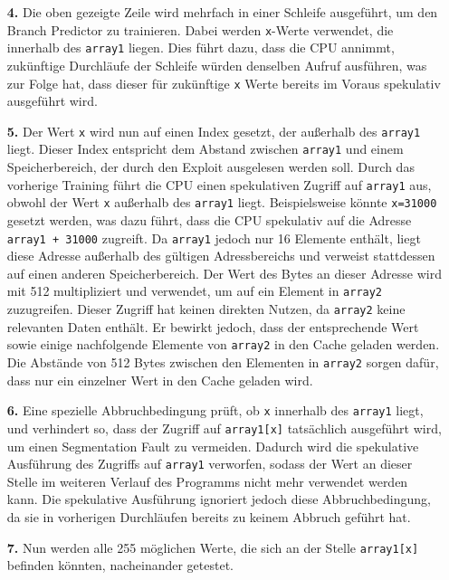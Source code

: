 \begin{itemize}
	\item[\textbf{4.}]\label{itm:spectre_step4} Die oben gezeigte Zeile wird mehrfach in einer Schleife ausgeführt, um den Branch Predictor zu trainieren.
	      Dabei werden \texttt{x}-Werte verwendet, die innerhalb des \texttt{array1} liegen.
	      Dies führt dazu, dass die CPU annimmt, zukünftige Durchläufe der Schleife würden denselben Aufruf ausführen,
	      was zur Folge hat, dass dieser für zukünftige \texttt{x} Werte bereits im Voraus spekulativ ausgeführt wird.
	\item[\textbf{5.}] Der Wert \texttt{x} wird nun auf einen Index gesetzt, der außerhalb des \texttt{array1} liegt.
	      Dieser Index entspricht dem Abstand zwischen \texttt{array1} und einem Speicherbereich, der durch den Exploit ausgelesen werden soll.
	      Durch das vorherige Training führt die CPU einen spekulativen Zugriff auf \texttt{array1} aus, obwohl der Wert \texttt{x} außerhalb des \texttt{array1} liegt.
	      Beispielsweise könnte \texttt{x=31000} gesetzt werden, was dazu führt, dass die CPU spekulativ auf die Adresse \texttt{array1 + 31000} zugreift.
	      Da \texttt{array1} jedoch nur 16 Elemente enthält, liegt diese Adresse außerhalb des gültigen Adressbereichs und verweist stattdessen auf einen anderen Speicherbereich.
	      Der Wert des Bytes an dieser Adresse wird mit 512 multipliziert und verwendet, um auf ein Element in \texttt{array2} zuzugreifen.
	      Dieser Zugriff hat keinen direkten Nutzen, da \texttt{array2} keine relevanten Daten enthält.
	      Er bewirkt jedoch, dass der entsprechende Wert sowie einige nachfolgende Elemente von \texttt{array2} in den Cache geladen werden.
	      Die Abstände von 512 Bytes zwischen den Elementen in \texttt{array2} sorgen dafür, dass nur ein einzelner Wert in den Cache geladen wird.
	\item[\textbf{6.}] Eine spezielle Abbruchbedingung prüft, ob \texttt{x} innerhalb des \texttt{array1} liegt, und verhindert so, dass der Zugriff auf \texttt{array1[x]} tatsächlich ausgeführt wird, um einen Segmentation Fault zu vermeiden.
	      Dadurch wird die spekulative Ausführung des Zugriffs auf \texttt{array1} verworfen, sodass der Wert an dieser Stelle im weiteren Verlauf des Programms nicht mehr verwendet werden kann.
	      Die spekulative Ausführung ignoriert jedoch diese Abbruchbedingung, da sie in vorherigen Durchläufen bereits zu keinem Abbruch geführt hat.
	\item[\textbf{7.}] Nun werden alle 255 möglichen Werte, die sich an der Stelle \texttt{array1[x]} befinden könnten, nacheinander getestet.

\end{itemize}
